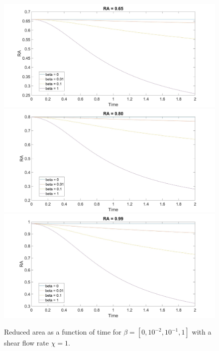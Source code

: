 \documentclass[aps,prl,showpacs]{revtex4}
\begin{document}
\begin{figure}
	\centering
	\includegraphics[width=.9\textwidth]{figures/7.jpg}
	\includegraphics[width=.9\textwidth]{figures/8.jpg}
	\includegraphics[width=.9\textwidth]{figures/9.jpg}
	\caption{Reduced area as a function of time for $\beta = [0, 10^{-2},10^{-1}, 1]$ with a shear flow rate $\chi = 1$.}
	\label{Shear0}
\end{figure}
\end{document}
